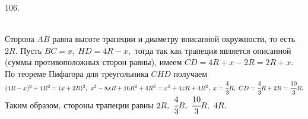 106. \begin{figure}[ht!]
\end{figure}\\
Сторона $AB$ равна высоте трапеции и диаметру вписанной окружности, то есть $2R.$ Пусть $BC=x,\ HD=4R-x,$ тогда так как трапеция является описанной (суммы противоположных сторон равны), имеем $CD=4R+x-2R=2R+x.$ По теореме Пифагора для треугольника $CHD$ получаем $(4R-x)^2+4R^2=(x+2R)^2,\
x^2-8xR+16R^2+4R^2=x^2+4xR+4R^2,\ x=\cfrac{4}{3}R,\ CD=\cfrac{4}{3}R+2R=\cfrac{10}{3}R.$ Таким образом,
стороны трапеции равны $2R,\ \cfrac{4}{3}R,\ \cfrac{10}{3}R,\ 4R.$\\
